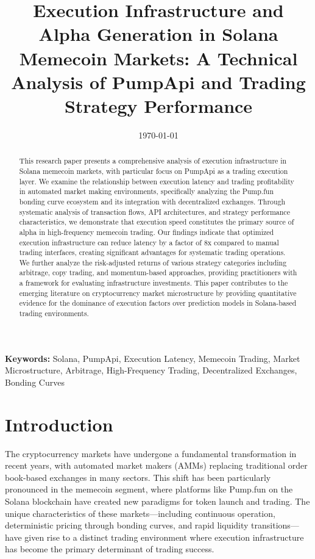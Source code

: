 \documentclass[12pt,a4paper]{article}
\title{Execution Infrastructure and Alpha Generation in Solana Memecoin Markets: A Technical Analysis of PumpApi and Trading Strategy Performance}
\author{}
\date{\today}
\begin{document}
\maketitle

\begin{abstract}
This research paper presents a comprehensive analysis of execution infrastructure in Solana memecoin markets, with particular focus on PumpApi as a trading execution layer. We examine the relationship between execution latency and trading profitability in automated market making environments, specifically analyzing the Pump.fun bonding curve ecosystem and its integration with decentralized exchanges. Through systematic analysis of transaction flows, API architectures, and strategy performance characteristics, we demonstrate that execution speed constitutes the primary source of alpha in high-frequency memecoin trading. Our findings indicate that optimized execution infrastructure can reduce latency by a factor of 8x compared to manual trading interfaces, creating significant advantages for systematic trading operations. We further analyze the risk-adjusted returns of various strategy categories including arbitrage, copy trading, and momentum-based approaches, providing practitioners with a framework for evaluating infrastructure investments. This paper contributes to the emerging literature on cryptocurrency market microstructure by providing quantitative evidence for the dominance of execution factors over prediction models in Solana-based trading environments.
\end{abstract}

\bigskip

\textbf{Keywords:} Solana, PumpApi, Execution Latency, Memecoin Trading, Market Microstructure, Arbitrage, High-Frequency Trading, Decentralized Exchanges, Bonding Curves

\newpage

\section{Introduction}

The cryptocurrency markets have undergone a fundamental transformation in recent years, with automated market makers (AMMs) replacing traditional order book-based exchanges in many sectors. This shift has been particularly pronounced in the memecoin segment, where platforms like Pump.fun on the Solana blockchain have created new paradigms for token launch and trading. The unique characteristics of these markets—including continuous operation, deterministic pricing through bonding curves, and rapid liquidity transitions—have given rise to a distinct trading environment where execution infrastructure has become the primary determinant of trading success.
\end{document}
